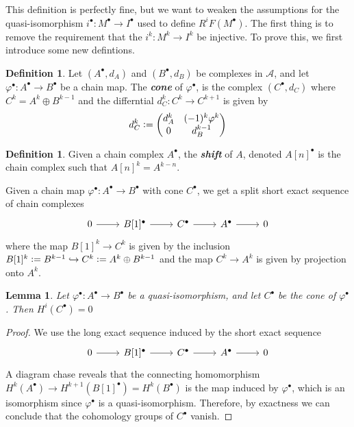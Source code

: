 \documentclass[psamsfonts, 12pt]{amsart}
\newtheorem{lem}[thm]{Lemma}
\theoremstyle{definition}
\newtheorem{defn}[thm]{Definition}
\theoremstyle{remark}
\newcommand{\ib}[1]{\textbf{\textit{#1}}}
\newcommand{\defeq}{\vcentcolon=}
\begin{document}
%
This definition is perfectly fine, but we want to weaken the assumptions for
the quasi-isomorphism $i^\bullet : M^\bullet \to I^\bullet$ used to define
$R^iF(M^\bullet)$. The first thing is to remove the requirement that the
$i^k : M^k \to I^k$ be injective. To prove this, we first introduce some new defintions.
%
\begin{defn}
Let $(A^\bullet, d_A)$ and $(B^\bullet, d_B)$ be complexes in $\mathcal{A}$,
and let $\varphi^\bullet : A^\bullet \to B^\bullet$ be a chain map.
The \ib{cone} of $\varphi^\bullet$, is the complex $(C^\bullet, d_C)$ where
$C^k = A^k \oplus B^{k-1}$ and the differntial $d_C^k : C^k \to C^{k+1}$ is given by
\[
d_C^k \defeq \begin{pmatrix}
d_A^k & (-1)^k\varphi^k \\
0 & d^{k-1}_B
\end{pmatrix}
\]
\end{defn}
%
\begin{defn}
Given a chain complex $A^\bullet$, the \ib{shift} of $A$, denoted $A[n]^\bullet$
is the chain complex such that $A[n]^k = A^{k-n}$.
\end{defn}
%
Given a chain map $\varphi^\bullet : A^\bullet \to B^\bullet$ with cone $C^\bullet$,
we get a split short exact sequence of chain complexes
\[\begin{tikzcd}
0 \ar[r] & B[1]^\bullet \ar[r] & C^\bullet \ar[r] & A^\bullet \ar[r] & 0
\end{tikzcd}\]
where the map $B[1]^k \to C^k$ is given by the inclusion
$B[1]^k \defeq B^{k-1} \hookrightarrow C^k \defeq A^k \oplus B^{k-1}$ and
the map $C^k \to A^k$ is given by projection onto $A^k$.
%
\begin{lem}
Let $\varphi^\bullet : A^\bullet \to B^\bullet$ be a quasi-isomorphism, and let
$C^\bullet$ be the cone of $\varphi^\bullet$. Then $H^i(C^\bullet) = 0$
\end{lem}
%
\begin{proof}
We use the long exact sequence induced by the short exact sequence
\[\begin{tikzcd}
0 \ar[r] & B[1]^\bullet \ar[r] & C^\bullet \ar[r] & A^\bullet \ar[r] & 0
\end{tikzcd}\]
A diagram chase reveals that the connecting homomorphism
$H^k(A^\bullet) \to H^{k+1}(B[1]^\bullet) = H^k(B^\bullet)$ is the map induced
by $\varphi^\bullet$, which is an isomorphism since $\varphi^\bullet$ is a
quasi-isomorphism. Therefore, by exactness we can conclude that
the cohomology groups of $C^\bullet$ vanish.
\end{proof}
\end{document}
